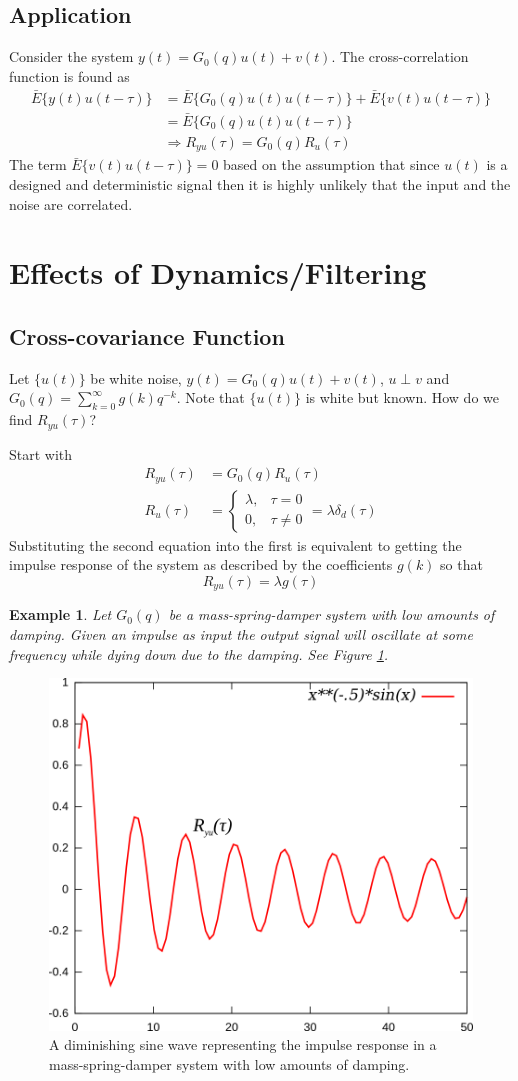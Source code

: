 \documentclass[lecture,12pt,]{pcms-l}
\theoremstyle{example}
\newtheorem{example}{Example}[section]
\begin{document}
\subsection{Application}
Consider the system $y(t)=G_0(q)u(t)+v(t)$. The cross-correlation function is found as
\begin{align*}
\bar{E}\{y(t)u(t-\tau)\} &= \bar{E}\{G_0(q)u(t)u(t-\tau)\} + \bar{E}\{v(t)u(t-\tau)\} \\
&= \bar{E}\{G_0(q)u(t)u(t-\tau)\} \\
&\Rightarrow R_{yu}(\tau) = G_0(q)R_u(\tau)
\end{align*}
The term $\bar{E}\{v(t)u(t-\tau)\} = 0$ based on the assumption that since $u(t)$ is a designed and deterministic signal then it is highly unlikely that the input and the noise are correlated.

\section{Effects of Dynamics/Filtering}
\subsection{Cross-covariance Function}
Let $\{u(t)\}$ be white noise, $y(t)=G_0(q)u(t)+v(t)$, $u\perp v$ and $G_0(q)=\sum_{k=0}^\infty g(k)q^{-k}$. Note that $\{u(t)\}$ is white but known. How do we find $R_{yu}(\tau)$?

Start with
\begin{align*}
R_{yu}(\tau) &= G_0(q)R_u(\tau) \\
R_u(\tau) &= \begin{cases} \lambda, & \tau=0 \\ 0, & \tau\neq 0 \end{cases} = \lambda\delta_d(\tau)
\end{align*}
Substituting the second equation into the first is equivalent to getting the impulse response of the system as described by the coefficients $g(k)$ so that
$$R_{yu}(\tau) = \lambda g(\tau)$$

\begin{example}
Let $G_0(q)$ be a mass-spring-damper system with low amounts of damping. Given an impulse as input the output signal will oscillate at some frequency while dying down due to the damping. See Figure \ref{fig:04dimSine}.
\end{example}
\begin{figure}[ht!]
	\centering
	\includegraphics[width=.5\textwidth]{images/04dimSine}
	\caption{A diminishing sine wave representing the impulse response in a mass-spring-damper system with low amounts of damping.}
	\label{fig:04dimSine}
\end{figure}
\end{document}
